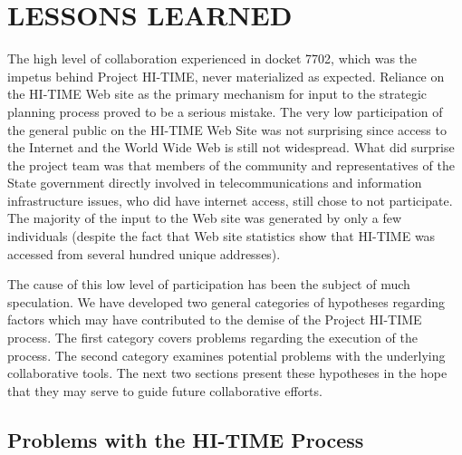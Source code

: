    
\section{LESSONS LEARNED}

The high level of collaboration experienced in docket 7702, which was the
impetus behind Project HI-TIME, never materialized as expected. Reliance on
the HI-TIME Web site as the primary mechanism for input to the strategic
planning process proved to be a serious mistake. The very low participation
of the general public on the HI-TIME Web Site was not surprising since
access to the Internet and the World Wide Web is still not widespread.
What did surprise the project team was that members of the community and
representatives of the State government directly involved in
telecommunications and information infrastructure issues, who did have
internet access, still chose to not participate.  The majority of the input
to the Web site was generated by only a few individuals (despite the fact
that Web site statistics show that HI-TIME was accessed from several
hundred unique addresses).
 
The cause of this low level of participation has been the subject of much
speculation.  We have developed two general categories of hypotheses
regarding factors which may
have contributed to the demise of the Project HI-TIME process.  The
first category covers problems regarding the execution of the process.  The second
category examines potential problems with the underlying collaborative
tools.  The next two  sections present these hypotheses in the hope that they may serve
to guide future collaborative efforts.


\subsection{Problems with the HI-TIME Process}

